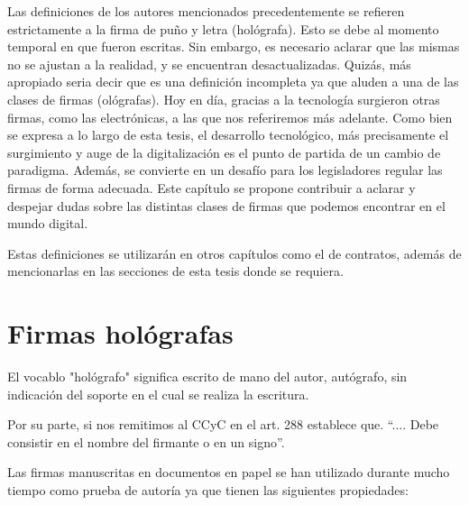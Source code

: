 \documentclass[12pt]{report} %
\begin{document}
\begin{itemize}
  Las definiciones de los autores mencionados precedentemente se refieren estrictamente a la firma de puño y letra (hológrafa). Esto se debe al momento temporal en que fueron escritas. Sin embargo, es necesario aclarar que las mismas no se ajustan a la realidad, y se encuentran desactualizadas. Quizás, más apropiado seria decir que es una definición incompleta ya que aluden a una de las clases de firmas (ológrafas). Hoy en día, gracias a la tecnología surgieron otras firmas, como las electrónicas, a las que nos referiremos más adelante. Como bien se expresa a lo largo de esta tesis, el desarrollo tecnológico, más precisamente el surgimiento y auge de la digitalización es el punto de partida de un cambio de paradigma. Además, se convierte en un desafío para los legisladores regular las firmas de forma adecuada. Este capítulo se propone contribuir a aclarar y despejar dudas sobre las distintas clases de firmas que podemos encontrar en el mundo digital.
 
Estas definiciones se utilizarán en otros capítulos como el de contratos, además de mencionarlas en las secciones de esta tesis donde se requiera.

\section{Firmas hológrafas}

El vocablo "hológrafo" significa escrito de mano del autor, autógrafo, sin indicación del soporte en el cual se realiza la escritura.

Por su parte, si nos remitimos al CCyC en el art. 288 establece que. “.... Debe consistir en el nombre del firmante o en un signo”. 

Las firmas manuscritas en documentos en papel se han utilizado durante mucho tiempo como prueba de autoría ya que tienen las siguientes propiedades:


\end{itemize}
\end{document}
